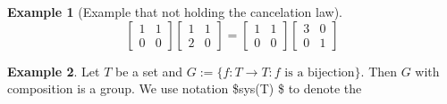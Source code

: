 \documentclass[
]{book}
\theoremstyle{definition}
\theoremstyle{definition}
\newtheorem{example}{Example}[chapter]
\theoremstyle{definition}
\theoremstyle{definition}
\theoremstyle{remark}
\begin{document}
\begin{example}[Example that not holding the cancelation law]
\protect\hypertarget{exm:unnamed-chunk-11}{}\label{exm:unnamed-chunk-11}\[\begin{bmatrix} 1 & 1 \\ 0 & 0\end{bmatrix}
\begin{bmatrix} 1 & 1 \\ 2 & 0\end{bmatrix}=
\begin{bmatrix} 1 & 1 \\ 0 & 0\end{bmatrix}
\begin{bmatrix} 3 & 0 \\ 0 & 1\end{bmatrix}\]
\end{example}

\begin{example}
\protect\hypertarget{exm:unnamed-chunk-12}{}\label{exm:unnamed-chunk-12}Let \(T\) be a set and \(G:=\{f:T\to T: f \text{ is a bijection}\}\). Then \(G\) with composition is a group. We use notation \$sys(T) \$ to denote the
\end{example}
\end{document}
